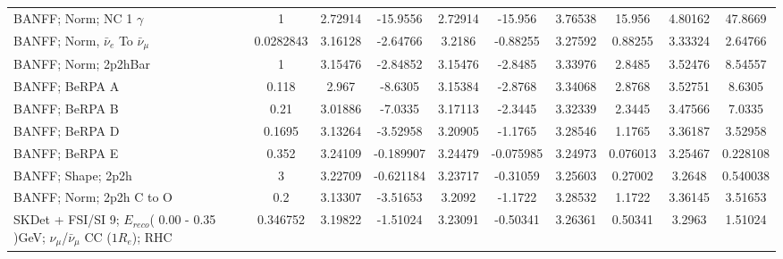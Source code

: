 \documentclass{standalone}
\begin{document}
\begin{tabular}{| l | S | S  S | S  S | S  S | S  S | }
                                                      BANFF; Norm; NC 1 $\gamma$ &               1 &         2.72914 &        -15.9556 &         2.72914 &         -15.956 &         3.76538 &          15.956 &         4.80162 &         47.8669 \\ 
                               BANFF; Norm, $\bar{\nu}_{e}$ To $\bar{\nu}_{\mu}$ &       0.0282843 &         3.16128 &        -2.64766 &          3.2186 &        -0.88255 &         3.27592 &         0.88255 &         3.33324 &         2.64766 \\ 
                                                            BANFF; Norm; 2p2hBar &               1 &         3.15476 &        -2.84852 &         3.15476 &         -2.8485 &         3.33976 &          2.8485 &         3.52476 &         8.54557 \\ 
                                                                  BANFF; BeRPA A &           0.118 &           2.967 &         -8.6305 &         3.15384 &         -2.8768 &         3.34068 &          2.8768 &         3.52751 &          8.6305 \\ 
                                                                  BANFF; BeRPA B &            0.21 &         3.01886 &         -7.0335 &         3.17113 &         -2.3445 &         3.32339 &          2.3445 &         3.47566 &          7.0335 \\ 
                                                                  BANFF; BeRPA D &          0.1695 &         3.13264 &        -3.52958 &         3.20905 &         -1.1765 &         3.28546 &          1.1765 &         3.36187 &         3.52958 \\ 
                                                                  BANFF; BeRPA E &           0.352 &         3.24109 &       -0.189907 &         3.24479 &       -0.075985 &         3.24973 &        0.076013 &         3.25467 &        0.228108 \\ 
                                                              BANFF; Shape; 2p2h &               3 &         3.22709 &       -0.621184 &         3.23717 &        -0.31059 &         3.25603 &         0.27002 &          3.2648 &        0.540038 \\ 
                                                        BANFF; Norm; 2p2h C to O &             0.2 &         3.13307 &        -3.51653 &          3.2092 &         -1.1722 &         3.28532 &          1.1722 &         3.36145 &         3.51653 \\ 
SKDet + FSI/SI  9; $E_{reco}$( 0.00 - 0.35 )GeV; $\nu_{\mu}$/$\bar{\nu}_{\mu}$ CC ($1R_{e}$); RHC &        0.346752 &         3.19822 &        -1.51024 &         3.23091 &        -0.50341 &         3.26361 &         0.50341 &          3.2963 &         1.51024 \\ 

\end{tabular}
\end{document}
